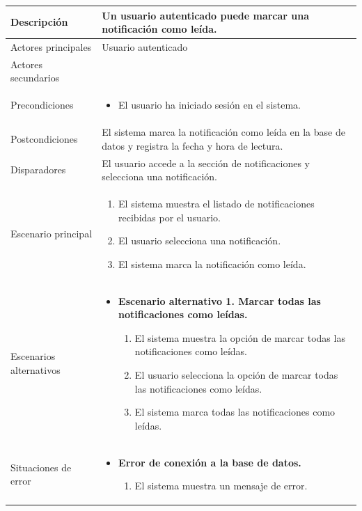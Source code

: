 \begin{longtable}{
   >{\columncolor{lightgreen!20}}p{4cm} %
    >{\columncolor{white}}p{12cm}        %
    }
    \midrule
    Descripción & Un usuario autenticado puede marcar una notificación como leída. \\
    \midrule
    Actores principales & Usuario autenticado \\
    \midrule
    Actores secundarios &  \\
    \midrule
    Precondiciones & \begin{itemize}[nosep,leftmargin=*]
        \item El usuario ha iniciado sesión en el sistema.
    \end{itemize} \\
    \midrule
    Postcondiciones &  El sistema marca la notificación como leída en la base de datos y registra la fecha y hora de lectura. \\
    \midrule
    Disparadores & El usuario accede a la sección de notificaciones y selecciona una notificación. \\
    \midrule
    Escenario principal & \begin{enumerate}[nosep,leftmargin=*]
        \item El sistema muestra el listado de notificaciones recibidas por el usuario.
        \item El usuario selecciona una notificación.
        \item El sistema marca la notificación como leída.
    \end{enumerate} \\
    \midrule
    Escenarios alternativos & 
    \begin{itemize}[nosep,leftmargin=*]
        \item \textbf{Escenario alternativo 1. Marcar todas las notificaciones como leídas.}
        \begin{enumerate}[nosep,leftmargin=*]
            \item El sistema muestra la opción de marcar todas las notificaciones como leídas.
            \item El usuario selecciona la opción de marcar todas las notificaciones como leídas.
            \item El sistema marca todas las notificaciones como leídas.
        \end{enumerate}
    \end{itemize} \\
    \midrule
    Situaciones de error & 
    \begin{itemize}[nosep,leftmargin=*]
        \item \textbf{Error de conexión a la base de datos.}
        \begin{enumerate}[nosep,leftmargin=*]
            \item El sistema muestra un mensaje de error.
        \end{enumerate}
    \end{itemize} \\
\end{longtable}

